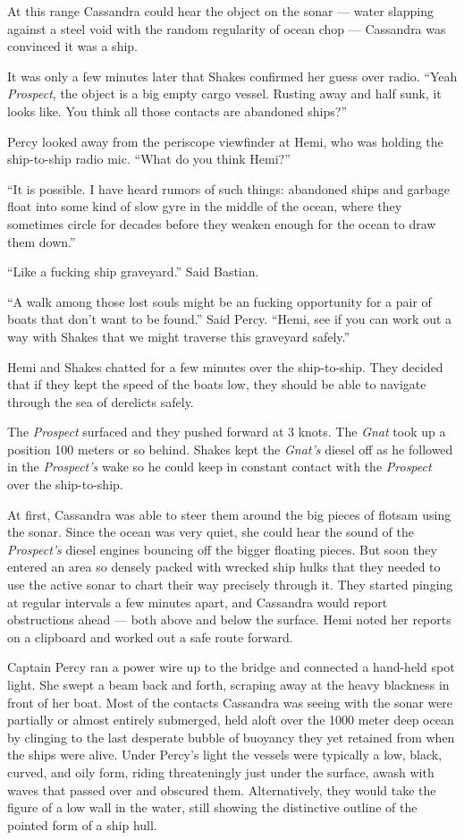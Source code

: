 \documentclass[]{scrbook}
\begin{document}
At this range Cassandra could hear the object on the sonar --- water
slapping against a steel void with the random regularity of ocean chop
--- Cassandra was convinced it was a ship.

It was only a few minutes later that Shakes confirmed her guess over
radio. ``Yeah \emph{Prospect}, the object is a big empty cargo vessel.
Rusting away and half sunk, it looks like. You think all those contacts
are abandoned ships?''

Percy looked away from the periscope viewfinder at Hemi, who was holding
the ship-to-ship radio mic. ``What do you think Hemi?''

``It is possible. I have heard rumors of such things: abandoned ships
and garbage float into some kind of slow gyre in the middle of the
ocean, where they sometimes circle for decades before they weaken enough
for the ocean to draw them down.''

``Like a fucking ship graveyard.'' Said Bastian.

``A walk among those lost souls might be an fucking opportunity for a
pair of boats that don't want to be found.'' Said Percy. ``Hemi, see if
you can work out a way with Shakes that we might traverse this graveyard
safely.''

Hemi and Shakes chatted for a few minutes over the ship-to-ship. They
decided that if they kept the speed of the boats low, they should be
able to navigate through the sea of derelicts safely.

The \emph{Prospect} surfaced and they pushed forward at 3 knots. The
\emph{Gnat} took up a position 100 meters or so behind. Shakes kept the
\emph{Gnat's} diesel off as he followed in the \emph{Prospect's} wake so
he could keep in constant contact with the \emph{Prospect} over the
ship-to-ship.

At first, Cassandra was able to steer them around the big pieces of
flotsam using the sonar. Since the ocean was very quiet, she could hear
the sound of the \emph{Prospect's} diesel engines bouncing off the
bigger floating pieces. But soon they entered an area so densely packed
with wrecked ship hulks that they needed to use the active sonar to
chart their way precisely through it. They started pinging at regular
intervals a few minutes apart, and Cassandra would report obstructions
ahead --- both above and below the surface. Hemi noted her reports on a
clipboard and worked out a safe route forward.

Captain Percy ran a power wire up to the bridge and connected a
hand-held spot light. She swept a beam back and forth, scraping away at
the heavy blackness in front of her boat. Most of the contacts Cassandra
was seeing with the sonar were partially or almost entirely submerged,
held aloft over the 1000 meter deep ocean by clinging to the last
desperate bubble of buoyancy they yet retained from when the ships were
alive. Under Percy's light the vessels were typically a low, black,
curved, and oily form, riding threateningly just under the surface,
awash with waves that passed over and obscured them. Alternatively, they
would take the figure of a low wall in the water, still showing the
distinctive outline of the pointed form of a ship hull.
\end{document}
